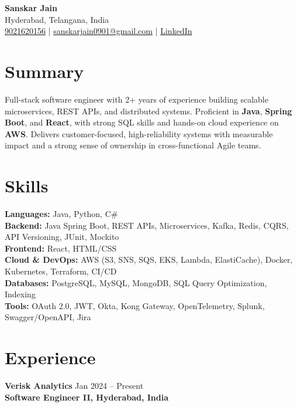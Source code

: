 \documentclass[letterpaper,10pt]{article}
\begin{document}
\begin{center}
    {\LARGE \textbf{Sanskar Jain}} \\
    Hyderabad, Telangana, India \\
    \href{tel:9021620156}{9021620156} \;|\;
    \href{mailto:sanskarjain0901@gmail.com}{sanskarjain0901@gmail.com} \;|\;
    \href{https://www.linkedin.com/in/sanskar-jain0901/}{LinkedIn}
\end{center}

\vspace{3pt}

\section*{Summary}
Full-stack software engineer with 2+ years of experience building scalable microservices, REST APIs, and distributed systems.
Proficient in \textbf{Java}, \textbf{Spring Boot}, and \textbf{React}, with strong SQL skills and hands-on cloud experience on \textbf{AWS}.
Delivers customer-focused, high-reliability systems with measurable impact and a strong sense of ownership in cross-functional Agile teams.

\section*{Skills}
\textbf{Languages:} Java, Python, C\# \\
\textbf{Backend:} Java Spring Boot, REST APIs, Microservices, Kafka, Redis, CQRS, API Versioning, JUnit, Mockito \\
\textbf{Frontend:} React, HTML/CSS \\
\textbf{Cloud \& DevOps:} AWS (S3, SNS, SQS, EKS, Lambda, ElastiCache), Docker, Kubernetes, Terraform, CI/CD \\
\textbf{Databases:} PostgreSQL, MySQL, MongoDB, SQL Query Optimization, Indexing \\
\textbf{Tools:} OAuth 2.0, JWT, Okta, Kong Gateway, OpenTelemetry, Splunk, Swagger/OpenAPI, Jira

\section*{Experience}

\textbf{Verisk Analytics} \hfill Jan 2024 -- Present \\
\textbf{Software Engineer II, Hyderabad, India}
\end{document}
